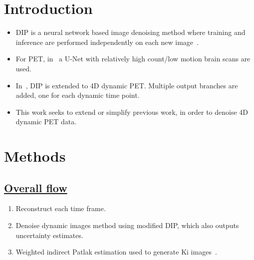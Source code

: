 \documentclass[portrait, color=UCLburgundy, margin=1cm]{uclposter}
\begin{document}
    \begin{multicols}{2}
        \section*{Introduction}
            \begin{highlightbox}[UCLlightgreen]
                \begin{itemize}
                    \item \gls{DIP} is a neural network based image denoising method where training and inference are performed independently on each new image~\cite{Ulyanov2018DeepPrior}.
                    \item For \acrshort{PET}, in~\cite{Gong2019PETPrior} a U-Net with relatively high count/low motion brain scans are used.
                    \item In~\cite{Hashimoto20214DNetwork}, \gls{DIP} is extended to \acrshort{4D} dynamic \acrshort{PET}. Multiple output branches are added, one for each dynamic time point.
                    \item This work seeks to extend or simplify previous work, in order to denoise \acrshort{4D} dynamic \acrshort{PET} data.
                \end{itemize}
            \end{highlightbox}
        
        \section*{Methods}
            \subsection*{\underline{\textbf{Overall flow}}}
                \begin{enumerate}
                    \item Reconstruct each time frame.
                    \item Denoise dynamic images method using modified \gls{DIP}, which also outputs uncertainty estimates.
                    \item Weighted indirect Patlak estimation used to generate Ki images~\cite{patlak1983GraphicalEvaluationBloodtoBrain}.
                \end{enumerate}
            

\end{multicols}
\end{document}
